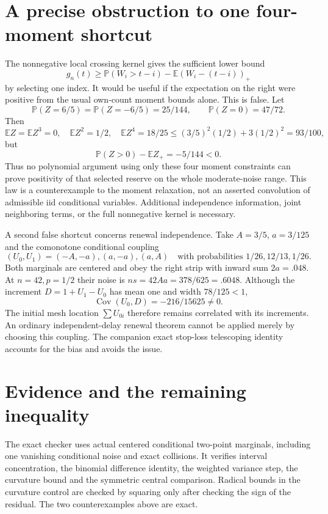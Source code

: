 \documentclass[11pt,a4paper]{article}
\newcommand{\E}{\mathbb E}\newcommand{\Pp}{\mathbb P}
\begin{document}
\section{A precise obstruction to one four-moment shortcut}
The nonnegative local crossing kernel gives the sufficient lower bound
\[
 g_n(t)\ge\Pp(W_i>t-i)-\E(W_i-(t-i))_+
\]
by selecting one index. It would be useful if the expectation on the right
were positive from the usual own-count moment bounds alone. This is false.
Let
\[
 \Pp(Z=6/5)=\Pp(Z=-6/5)=25/144,
                 \qquad\Pp(Z=0)=47/72.
\]
Then
\[
 \E Z=\E Z^3=0,\quad \E Z^2=1/2,\quad\E Z^4=18/25
       \le(3/5)^2(1/2)+3(1/2)^2=93/100,
\]
but
\[
                   \Pp(Z>0)-\E Z_+=-5/144<0.
\]
Thus no polynomial argument using only these four moment constraints can
prove positivity of that selected reserve on the whole moderate-noise
range. This law is a counterexample to the moment relaxation, not an
asserted convolution of admissible iid conditional variables. Additional
independence information, joint neighboring terms, or the full nonnegative
kernel is necessary.

A second false shortcut concerns renewal independence. Take $A=3/5$,
$a=3/125$ and the comonotone conditional coupling
\[
 (U_0,U_1)=(-A,-a),(a,-a),(a,A)
       \quad\text{with probabilities }1/26,12/13,1/26.
\]
Both marginals are centered and obey the right strip with inward sum
$2a=.048$. At $n=42,p=1/2$ their noise is
$ns=42Aa=378/625=.6048$. Although the increment
$D=1+U_1-U_0$ has mean one and width $78/125<1$,
\[
                      \operatorname{Cov}(U_0,D)=-216/15625\ne0.
\]
The initial mesh location $\sum U_{0i}$ therefore remains correlated
with its increments. An ordinary independent-delay renewal theorem cannot
be applied merely by choosing this coupling. The companion exact
stop-loss telescoping identity accounts for the bias and avoids the issue.

\section{Evidence and the remaining inequality}
The exact checker uses actual centered conditional two-point marginals,
including one vanishing conditional noise and exact collisions. It verifies
interval concentration, the binomial difference identity, the weighted
variance step, the curvature bound and the symmetric central comparison.
Radical bounds in the curvature control are checked by squaring only after
checking the sign of the residual. The two counterexamples above are exact.
\end{document}
